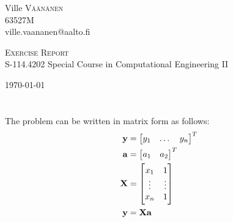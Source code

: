 \documentclass[a4paper,oneside,article]{memoir}
\author{Ville Väänänen}
\newcommand{\course}{S-114.4202}
\newcommand{\coursename}{Special Course in Computational Engineering II}
\newcommand{\studentid}{63527M}
\renewcommand{\title}{Exercise Report}
\begin{document}
\begin{titlingpage}
	\begin{adjustwidth}{-0.6in}{-0.6in}
	\begin{center}
			\begin{flushright} \large
			Ville \textsc{Väänänen}\\
			\studentid\\
			ville.vaananen@aalto.fi
			\end{flushright}
		\vspace{8.0cm}
		
		\textsc{\LARGE \title}
		\HRule \\[0.19cm]
		{\large \course\: \coursename}
		
		\vfill
		\today
	\end{center}
	\end{adjustwidth}
\end{titlingpage}
\newpage


\section{}
\subsection{}
\subsubsection{}


The problem can be written in matrix form as follows:
\begin{align*}
	\mathbf{y} &= \begin{bmatrix} y_1 & \dots & y_n \end{bmatrix}^T \\
	\mathbf{a} &= \begin{bmatrix} a_1 & a_2 \end{bmatrix}^T \\	
	\mathbf{X} &= \begin{bmatrix} 
				x_1 & 1 \\
				\vdots & \vdots \\
				x_n & 1 
	\end{bmatrix} \\
	\mathbf{y} &= \mathbf{Xa}
\end{align*}
\end{document}
